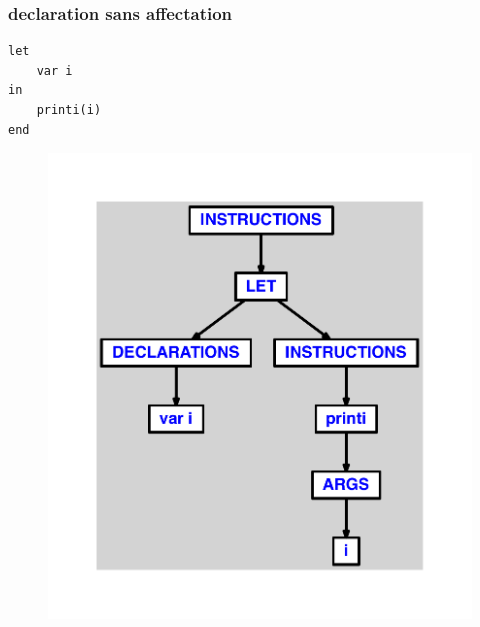 \documentclass{article}
\begin{document}
\subsubsection{declaration sans affectation}
\begin{lstlisting}
let
	var i
in
	printi(i)
end
\end{lstlisting}
\newpage
\begin{figure}[H]
\centering
\includegraphics[max width=\textwidth]{ast/ast_288.pdf}
\end{figure}
\newpage
\end{document}
